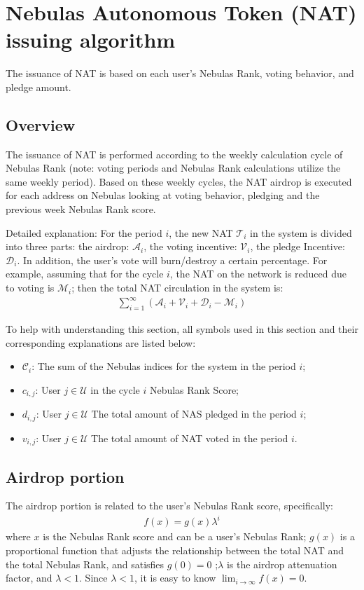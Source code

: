 
\section{Nebulas Autonomous Token (NAT) ​​issuing algorithm}

The issuance of NAT is based on each user's Nebulas Rank, voting behavior, and pledge amount.

\subsection{Overview}
The issuance of NAT is performed according to the weekly calculation cycle of Nebulas Rank (note: voting periods and Nebulas Rank calculations utilize the same weekly period). Based on these weekly cycles, the NAT airdrop is executed for each address on Nebulas looking at voting behavior, pledging and the previous week Nebulas Rank score.

Detailed explanation: 
For the period $i$, the new NAT $\mathcal{T}_i$ in the system is divided into three parts: the airdrop: $\mathcal{A}_i$, the voting incentive: $\mathcal{V}_i$, the pledge Incentive: $\mathcal{D}_i$.
In addition, the user's vote will burn/destroy a certain percentage. For example, assuming that for the cycle $i$, the NAT on the network is reduced due to voting is $\mathcal{M}_i$; then the total NAT circulation in the system is:
\begin{align}
\sum_{i=1}^{\infty} (\mathcal{A}_i + \mathcal{V}_i + \mathcal{D}_i - \mathcal{M}_i)
\end{align}

To help with understanding this section, all symbols used in this section and their corresponding explanations are listed below:
\begin{itemize}
\item $\mathcal{C}_i$: The sum of the Nebulas indices for the system in the period $i$;
\item $c_{i,j}$: User $j \in \mathcal{U}$ in the cycle $i$ Nebulas Rank Score;
\item $d_{i,j}$: User $j \in \mathcal{U}$ The total amount of NAS pledged in the period $i$;
\item $v_{i,j}$: User $j \in \mathcal{U}$ The total amount of NAT voted in the period $i$.
\end{itemize}

\subsection{Airdrop portion}
The airdrop portion is related to the user's Nebulas Rank score, specifically:
\begin{align}
    f(x) = g(x)\lambda^i
\end{align}
\noindent where $x$ is the Nebulas Rank score and can be a user's Nebulas Rank; $g(x)$ is a proportional function that adjusts the relationship between the total NAT and the total Nebulas Rank, and satisfies $g(0) = 0$ ;$\lambda$ is the airdrop attenuation factor, and $\lambda < 1$.
Since $\lambda < 1$, it is easy to know $\lim_{i\to \infty}f(x) = 0$.

